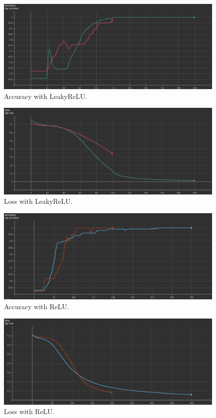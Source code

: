 	\begin{figure}[H]
		\centering
		\includegraphics[scale=0.5]{img/adam_acc.png}
		\caption{Accuracy with LeakyReLU.}
		\label{activation-acc-leaky-relu}
	\end{figure}
	\begin{figure}[H]
		\centering
		\includegraphics[scale=0.5]{img/adam_loss.png}
		\caption{Loss with LeakyReLU.}
		\label{activation-loss-leaky-relu}
	\end{figure}

	\begin{figure}[H]
		\centering
		\includegraphics[scale=0.5]{img/relu_acc.png}
		\caption{Accuracy with ReLU.}
		\label{activation-acc-relu}
	\end{figure}
	\begin{figure}[H]
		\centering
		\includegraphics[scale=0.5]{img/relu_loss.png}
		\caption{Loss with ReLU.}
		\label{activation-loss-relu}
	\end{figure}

